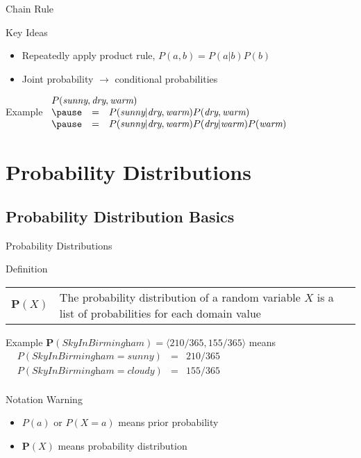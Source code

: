 \documentclass[14pt]{beamer}
\begin{document}
\begin{frame}{Chain Rule}
\begin{block}{Key Ideas}
\begin{itemize}
\item Repeatedly apply product rule, $P(a,b) = P(a|b)P(b)$
\item Joint probability $\rightarrow$ conditional probabilities
\end{itemize}
\end{block}
\pause
\begin{block}{Example}
$
\begin{array}{lll}
\lefteqn{P(\textit{sunny}, \textit{dry}, \textit{warm})} \\
\pause
& = & P(\textit{sunny}|\textit{dry}, \textit{warm})P(\textit{dry}, \textit{warm})\\
\pause
& = & P(\textit{sunny}|\textit{dry}, \textit{warm})P(\textit{dry}|\textit{warm})P(\textit{warm}) \\
\end{array}
$
\end{block}
\end{frame}


\section{Probability Distributions}


\subsection{Probability Distribution Basics}


\begin{frame}{Probability Distributions}
\begin{block}{Definition}
\begin{tabular}{lm{}@{}}
\large $\mathbf{P}(X)$
&
The \alert{probability distribution} of a random variable $X$ is a list of probabilities for each domain value
\end{tabular}
\end{block}
\pause
\begin{block}{Example}
$\mathbf{P}(\textit{SkyInBirmingham}) = \langle 210/365, 155/365 \rangle$ means \\[.25em]
$
\begin{array}{llll}
& P(\textit{SkyInBirmingham}=\textit{sunny})  & = & 210/365 \\
& P(\textit{SkyInBirmingham}=\textit{cloudy}) & = & 155/365 \\
\end{array}
$
\end{block}
\pause
\begin{block}{Notation Warning}
\begin{itemize}
\item $P(a)$ or $P(X=a)$ means prior probability
\item $\mathbf{P}(X)$ means probability distribution
\end{itemize}
\end{block}
\end{frame}
\end{document}
